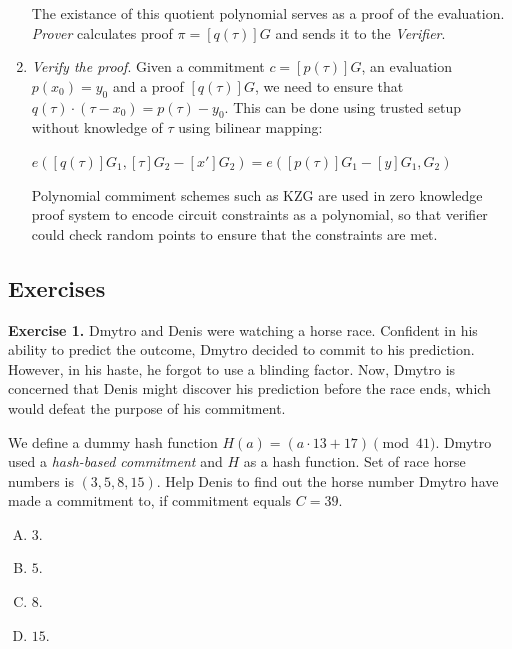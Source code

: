 \documentclass[../lecture-notes.tex]{subfiles}
\begin{document}
\begin{enumerate}
    The existance of this quotient polynomial serves
    as a proof of the evaluation. \textit{Prover} calculates proof $\pi = [q(\tau)]G$ and sends it to the \textit{Verifier}.

    \item \textit{Verify the proof}. Given a commitment $c = [p(\tau)]G$, an evaluation $p(x_0) = y_0$ and a proof $[q(\tau)]G$, we need to
    ensure that $q(\tau) \cdot (\tau - x_0) = p(\tau) - y_0$. This can be done using trusted setup without knowledge of $\tau$ using bilinear mapping:

    \begin{center}
        $e([q(\tau)]G_1, [\tau]G_2 - [x']G_2) = e([p(\tau)]G_1 - [y]G_1, G_2)$
    \end{center}
    
    Polynomial commiment schemes such as KZG are used in zero knowledge proof system to encode circuit constraints as a polynomial, 
    so that verifier could check random points to ensure that the constraints are met.

\end{enumerate}

\subsection{Exercises}

\textbf{Exercise 1.} Dmytro and Denis were watching a horse race. 
    Confident in his ability to predict the outcome, Dmytro decided to commit to his prediction. 
    However, in his haste, he forgot to use a blinding factor. 
    Now, Dmytro is concerned that Denis might discover his prediction before the race ends, 
    which would defeat the purpose of his commitment.
    
    We define a dummy hash function $H(a) = (a \cdot 13 + 17) \pmod{41}$.
    Dmytro used a \textit{hash-based commitment} and $H$ as a hash function. 
    Set of race horse numbers is $(3, 5, 8, 15)$.
    Help Denis to find out the horse number Dmytro have made a commitment to, 
    if commitment equals $C = 39$.

\begin{enumerate}[(A)]
    \item $3$.
    \item $5$.
    \item $8$.
    \item $15$.
\end{enumerate}
\end{document}
